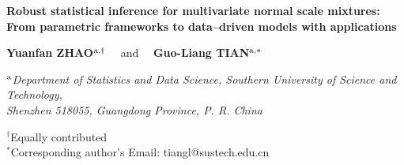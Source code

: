 \begin{flushleft}
{\Large \bf Robust statistical inference for multivariate normal scale mixtures: From parametric frameworks to data--driven models with applications}
\end{flushleft}

\smallskip
\begin{flushleft}
{\bf Yuanfan ZHAO$^{{\rm a}, \dag}$}   \ \  and \ \
{\bf Guo-Liang TIAN$^{{\rm a}, *}$}  \ \

\vkL
{\small \it $^{\rm a}$Department of Statistics and Data Science,
                      Southern University of Science and Technology, \\ Shenzhen 518055, Guangdong Province, P. R. China}

\vkL
{\small  $^{\dag}$Equally contributed} \\
{\small  $^*$Corresponding author's Email: \textsf{tiangl@sustech.edu.cn}} \\
\end{flushleft}

\baselineskip 0.30in \vskip 0.05in 

\vkL {}   

\baselineskip 0.30in
\setcounter{equation}{0}
